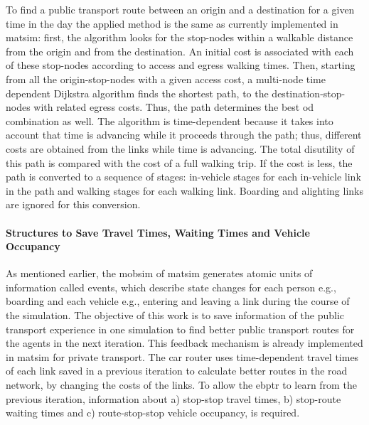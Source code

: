 To find a public transport route between an origin and a destination for a given time in the day the applied method is the same as currently implemented in \gls{matsim}: first, the algorithm looks for the stop-nodes within a walkable distance from the origin and from the destination. An initial cost is associated with each of these stop-nodes according to access and egress walking times. Then, starting from all the origin-stop-nodes with a given access cost, a multi-node time dependent Dijkstra algorithm finds the shortest path, to the destination-stop-nodes with related egress costs. Thus, the path determines the best \gls{od} combination as well. The algorithm is time-dependent because it takes into account that time is advancing while it proceeds through the path; thus, different costs are obtained from the links while time is advancing. The total disutility of this path is compared with the cost of a full walking trip. If the cost is less, the path is converted to a sequence of stages: in-vehicle stages for each in-vehicle link in the path and walking stages for each walking link. Boarding and alighting links are ignored for this conversion.

\paragraph{Structures to Save Travel Times, Waiting Times and Vehicle Occupancy} 
\label{subsec:Structures}

As mentioned earlier, the \gls{mobsim} of \gls{matsim} generates atomic units of information called \glspl{event}, which describe state changes for each person e.g., boarding and each vehicle e.g., entering and leaving a link during the course of the simulation. The objective of this work is to save information of the public transport experience in one simulation to find better public transport routes for the agents in the next iteration. This feedback mechanism is already implemented in \gls{matsim} for private transport. The car router uses time-dependent travel times of each link saved in a previous iteration to calculate better routes in the road network, by changing the costs of the links. To allow the \gls{ebptr} to learn from the previous iteration, information about a) stop-stop travel times, b) stop-route waiting times and c) route-stop-stop vehicle occupancy, is required.

